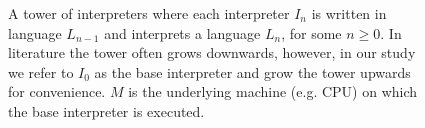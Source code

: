 \documentclass[a4paper,12pt,twoside,openright]{report}
\theoremstyle{definition}
\begin{document}
\begin{figure}[htp!]
    \centering
    \caption{A tower of interpreters where each interpreter $I_n$ is written in language $L_{n-1}$ and interprets a language $L_n$, for some $n \geq 0$. In literature the tower often grows downwards, however, in our study we refer to $I_0$ as the base interpreter and grow the tower upwards for convenience. $M$ is the underlying machine (e.g. CPU) on which the base interpreter is executed.}
    \label{fig:tombstone_tower_ex1}
\end{figure}

\end{document}
